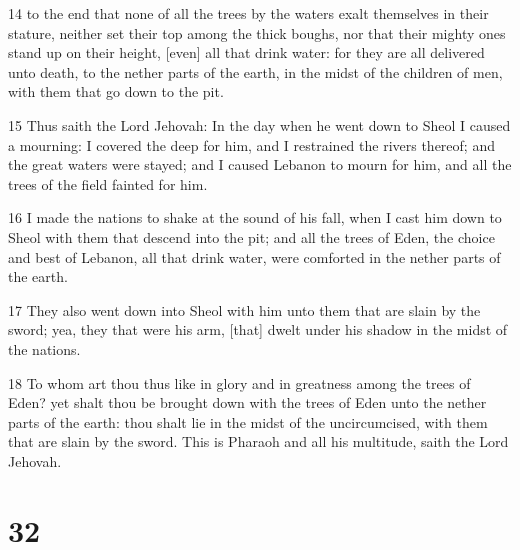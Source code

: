 \par 14 to the end that none of all the trees by the waters exalt themselves in their stature, neither set their top among the thick boughs, nor that their mighty ones stand up on their height, [even] all that drink water: for they are all delivered unto death, to the nether parts of the earth, in the midst of the children of men, with them that go down to the pit.
\par 15 Thus saith the Lord Jehovah: In the day when he went down to Sheol I caused a mourning: I covered the deep for him, and I restrained the rivers thereof; and the great waters were stayed; and I caused Lebanon to mourn for him, and all the trees of the field fainted for him.
\par 16 I made the nations to shake at the sound of his fall, when I cast him down to Sheol with them that descend into the pit; and all the trees of Eden, the choice and best of Lebanon, all that drink water, were comforted in the nether parts of the earth.
\par 17 They also went down into Sheol with him unto them that are slain by the sword; yea, they that were his arm, [that] dwelt under his shadow in the midst of the nations.
\par 18 To whom art thou thus like in glory and in greatness among the trees of Eden? yet shalt thou be brought down with the trees of Eden unto the nether parts of the earth: thou shalt lie in the midst of the uncircumcised, with them that are slain by the sword. This is Pharaoh and all his multitude, saith the Lord Jehovah.

\chapter{32}

